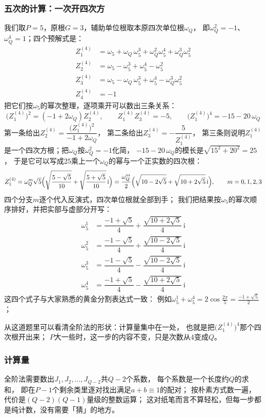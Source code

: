 \documentclass[UTF8,a4paper,11pt]{ctexart}
\newcommand{\ii}{\mathrm{i}}
\begin{document}
\subsubsection{五次的计算：一次开四次方}
我们取$P=5$，原根$G=3$，辅助单位根取本原四次单位根$\omega_Q$，
即$\omega_Q^2=-1$、$\omega_Q^4=1$；四个预解式是：
\[
 \begin{aligned}
 Z^{(4)}_1&=\omega_5+\omega_Q\,\omega_5^{3}+\omega_Q^2\omega_5^{4}+\omega_Q^3\omega_5^{2}\\[2pt]
 Z^{(4)}_2&=\omega_5-\omega_5^{3}+\omega_5^{4}-\omega_5^{2}\\[2pt]
 Z^{(4)}_3&=\omega_5-\omega_Q\,\omega_5^{3}+\omega_5^{4}-\omega_Q^3\omega_5^{2}\\[2pt]
 Z^{(4)}_4&=-1
 \end{aligned}
\]
把它们按$\omega_5$的幂次整理，逐项乘开可以数出三条关系：
\[
 \bigl(Z^{(4)}_1\bigr)^2=(-1+2\omega_Q)Z^{(4)}_2,\qquad
 Z^{(4)}_1Z^{(4)}_3=-5,\qquad
 \bigl(Z^{(4)}_1\bigr)^4=-15-20\,\omega_Q
\]
第一条给出$Z^{(4)}_2=\dfrac{\bigl(Z^{(4)}_1\bigr)^2}{-1+2\omega_Q}$，
第二条给出$Z^{(4)}_3=-\dfrac{5}{Z^{(4)}_1}$，
第三条则说明$Z^{(4)}_1$是一个四次方根；把$\omega_Q$按$\omega_Q^2=-1$化简，
$-15-20\,\omega_Q$的模长是$\sqrt{15^2+20^2}=25$，
于是它可以写成$25$乘上一个$\omega_Q$的幂与一个正实数的四次根：
\[
 Z^{(4)}_1=\omega_Q^{m}\sqrt{5}\Bigl(\sqrt{\frac{5-\sqrt5}{10}}+\sqrt{\frac{5+\sqrt5}{10}}\,\ii\Bigr)
 =\frac{\omega_Q^{m}}{2}\Bigl(\sqrt{10-2\sqrt5}+\sqrt{10+2\sqrt5}\,\ii\Bigr),
 \qquad m=0,1,2,3
\]
四个分支$m$逐个代入反演式，四次单位根就全部到手；
我们把结果按$\omega_5$的幂次顺序排好，并把实部与虚部分开写：
\[
 \begin{aligned}
 \omega_5^{1}&=\dfrac{-1+\sqrt5}{4}+\dfrac{\sqrt{10+2\sqrt5}}{4}\,\ii\\[6pt]
 \omega_5^{2}&=\dfrac{-1-\sqrt5}{4}+\dfrac{\sqrt{10-2\sqrt5}}{4}\,\ii\\[6pt]
 \omega_5^{3}&=\dfrac{-1-\sqrt5}{4}-\dfrac{\sqrt{10-2\sqrt5}}{4}\,\ii\\[6pt]
 \omega_5^{4}&=\dfrac{-1+\sqrt5}{4}-\dfrac{\sqrt{10+2\sqrt5}}{4}\,\ii
 \end{aligned}
\]
这四个式子与大家熟悉的黄金分割表达式一致：
例如$\omega_5^1+\omega_5^4=2\cos\frac{2\pi}{5}=\frac{-1+\sqrt5}{2}$；

从这道题里可以看清全阶法的形状：计算量集中在一处，
也就是把$\bigl(Z^{(4)}_1\bigr)^4$那个四次根开出来；
$P$大一些时，这一步的内容不变，只是次数从$4$变成$Q$。\par

\subsubsection{计算量}
全阶法需要数出$J_1,J_2,\dots,J_{Q-2}$共$Q-2$个系数，
每个系数是一个长度约$Q$的求和，
即在$P-1$个剩余类里逐对找出满足$a+b\equiv1$的配对；
按朴素方式数一遍，代价是$(Q-2)(Q-1)$量级的整数运算；
这对纸笔而言不算轻松，但每一步都是纯计数，没有需要「猜」的地方。
\end{document}
